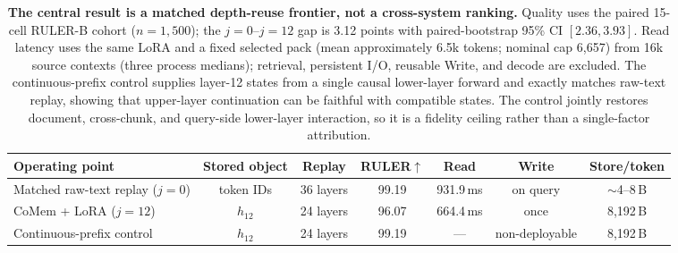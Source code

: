 \begin{table}[!t]
\centering
\scriptsize
\setlength{\tabcolsep}{4.2pt}
\begin{tabular}{@{}lcccccc@{}}
\toprule
\textbf{Operating point} & \textbf{Stored object} & \textbf{Replay} &
\textbf{RULER}$\uparrow$ & \textbf{Read} & \textbf{Write} &
\textbf{Store/token} \\
\midrule
Matched raw-text replay ($j{=}0$) & token IDs & 36 layers &
99.19 & 931.9\,ms & on query & $\sim$4--8\,B \\
CoMem + LoRA ($j{=}12$) & $h_{12}$ & 24 layers &
96.07 & 664.4\,ms & once & 8,192\,B \\
Continuous-prefix control & $h_{12}$ & 24 layers &
99.19 & --- & non-deployable & 8,192\,B \\
\bottomrule
\end{tabular}
\caption{\textbf{The central result is a matched depth-reuse frontier, not a
cross-system ranking.}
Quality uses the paired 15-cell RULER-B cohort ($n{=}1{,}500$); the
$j{=}0$--$j{=}12$ gap is 3.12 points with paired-bootstrap 95\% CI
$[2.36,3.93]$. Read latency uses the same LoRA and a fixed selected pack
(mean approximately 6.5k tokens; nominal cap 6,657) from 16k source contexts
(three process medians); retrieval, persistent I/O, reusable Write, and decode
are excluded. The continuous-prefix control supplies layer-12 states from a
single causal lower-layer forward and exactly matches raw-text replay, showing
that upper-layer continuation can be faithful with compatible states. The
control jointly restores document, cross-chunk, and query-side lower-layer
interaction, so it is a fidelity ceiling rather than a single-factor
attribution.}
\label{tab:core-tradeoff}
\end{table}
